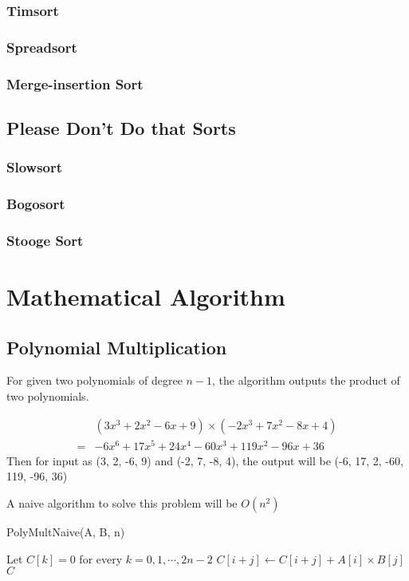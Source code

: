 			\subsection{Timsort}

			\subsection{Spreadsort}

			\subsection{Merge-insertion Sort}

		\section{Please Don't Do that Sorts}
			\subsection{Slowsort}

			\subsection{Bogosort}

			\subsection{Stooge Sort}

	\chapter{Mathematical Algorithm}
		\section{Polynomial Multiplication}
			For given two polynomials of degree $n - 1$, the algorithm outputs the product of two polynomials.
			\begin{example}
				\begin{align}
					&(3x^3 + 2x^2 - 6x + 9) \times (-2x^3 + 7x^2 - 8x + 4)\\
					=& -6x^6 + 17x^5 + 24x^4 -60x^3 +119x^2 -96x +36
				\end{align}
				Then for input as (3, 2, -6, 9) and (-2, 7, -8, 4), the output will be (-6, 17, 2, -60, 119, -96, 36)
			\end{example}

			A naive algorithm to solve this problem will be $O(n^2)$
			\begin{algorithm}[h]
				\caption{PolyMultNaive(A, B, n)}
				\begin{algorithmic}[1]
					\State Let $C[k] = 0$ for every $k = 0, 1, \cdots, 2n - 2$
							\State $C[i + j] \gets C[i + j] + A[i] \times B[j]$
						\EndFor
					\EndFor
					\Return $C$
				\end{algorithmic}
			\end{algorithm}

